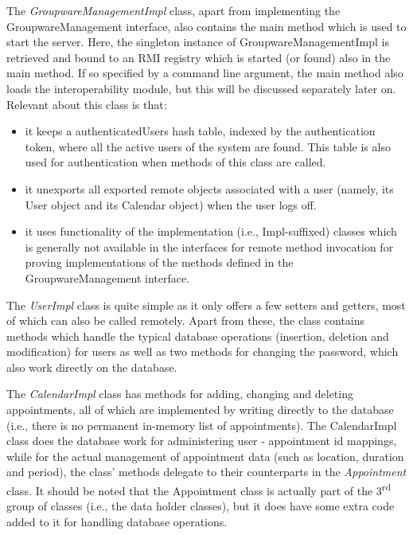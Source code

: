 \documentclass[a4paper,10pt]{article}
\begin{document}
The \textit{GroupwareManagementImpl} class, apart from implementing the GroupwareManagement
interface, also contains the main method which is used to start the server. Here, the singleton
instance of GroupwareManagementImpl is retrieved and bound to an RMI registry which is
started (or found) also in the main method. If so specified by a command line argument, the
main method also loads the interoperability module, but this will be discussed separately later
on. Relevant about this class is that:

\begin{itemize}

\item it keeps a authenticatedUsers hash table, indexed by the authentication token, where all
the active users of the system are found. This table is also used for authentication when methods
of this class are called.

\item it unexports all exported remote objects associated with a user (namely, its User object and
its Calendar object) when the user logs off.

\item it uses functionality of the implementation (i.e., Impl-suffixed) classes which is generally
not available in the interfaces for remote method invocation for proving implementations of 
the methods defined in the GroupwareManagement interface.

\end{itemize}

The \textit{UserImpl} class is quite simple as it only offers a few setters and getters, most of
which can also be called remotely. Apart from these, the class contains methods which handle
the typical database operations (insertion, deletion and modification) for users as well as two
methods for changing the password, which also work directly on the database.

The \textit{CalendarImpl} class has methods for adding, changing and deleting appointments,
all of which are implemented by writing directly to the database (i.e., there is no permanent
in-memory list of appointments). The CalendarImpl class does the database work for administering
user - appointment id mappings, while for the actual management of appointment data (such
as location, duration and period), the class' methods delegate to their counterparts in the
\textit{Appointment} class. It should be noted that the Appointment class is actually part of
the 3\textsuperscript{rd} group of classes (i.e., the data holder classes), but it does have some
extra code added to it for handling database operations.
\end{document}
